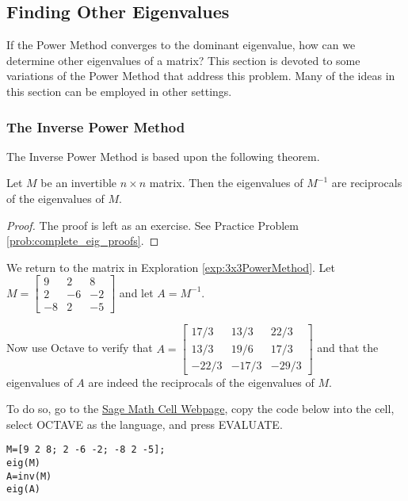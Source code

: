 \documentclass{ximera}
\begin{document}
\subsection*{Finding Other Eigenvalues}

If the Power Method converges to the dominant eigenvalue, how can we determine other eigenvalues of a matrix?  This section is devoted to some variations of the Power Method that address this problem.  Many of the ideas in this section can be employed in other settings.

\subsubsection*{The Inverse Power Method}

The Inverse Power Method is based upon the following theorem.

\begin{theorem}\label{th:eig_inverse}
Let $M$ be an invertible $n \times n$ matrix.  Then the eigenvalues of $M^{-1}$ are reciprocals of the eigenvalues of $M$.
\end{theorem}

\begin{proof}
The proof is left as an exercise.  See Practice Problem \ref{prob:complete_eig_proofs}.
\end{proof}

We return to the matrix in Exploration \ref{exp:3x3PowerMethod}.  Let $M=\left[ \begin{array}{rrr}
9 & 2 & 8 \\
2 & -6 & -2 \\
-8 & 2 & -5
\end{array}\right]$ and let $A=M^{-1}$.  

Now use Octave to verify that $A=\left[ \begin{array}{rrr}
17/3 & 13/3 & 22/3 \\
13/3 & 19/6 & 17/3 \\
-22/3 & -17/3 & -29/3
\end{array}\right]$ and that the eigenvalues of $A$ are indeed the reciprocals of the eigenvalues of $M$.

To do so, go to the \href{https://sagecell.sagemath.org/}{Sage Math Cell Webpage}, copy the code below into the cell, select OCTAVE as the language, and press EVALUATE.
\begin{verbatim}
M=[9 2 8; 2 -6 -2; -8 2 -5];
eig(M)
A=inv(M)
eig(A)
\end{verbatim}
\end{document}

